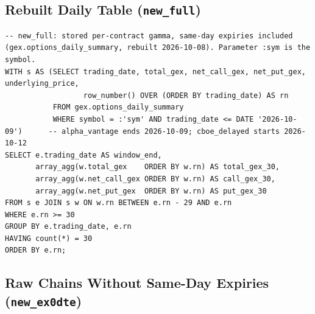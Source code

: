 \subsection{Rebuilt Daily Table (\texttt{new\_full})}
\label{app:series:full}

\begin{lstlisting}[style=appcode]
-- new_full: stored per-contract gamma, same-day expiries included (gex.options_daily_summary, rebuilt 2026-10-08). Parameter :sym is the symbol.
WITH s AS (SELECT trading_date, total_gex, net_call_gex, net_put_gex, underlying_price,
                  row_number() OVER (ORDER BY trading_date) AS rn
           FROM gex.options_daily_summary
           WHERE symbol = :'sym' AND trading_date <= DATE '2026-10-09')      -- alpha_vantage ends 2026-10-09; cboe_delayed starts 2026-10-12
SELECT e.trading_date AS window_end,
       array_agg(w.total_gex    ORDER BY w.rn) AS total_gex_30,
       array_agg(w.net_call_gex ORDER BY w.rn) AS call_gex_30,
       array_agg(w.net_put_gex  ORDER BY w.rn) AS put_gex_30
FROM s e JOIN s w ON w.rn BETWEEN e.rn - 29 AND e.rn
WHERE e.rn >= 30
GROUP BY e.trading_date, e.rn
HAVING count(*) = 30
ORDER BY e.rn;
\end{lstlisting}

\subsection{Raw Chains Without Same-Day Expiries (\texttt{new\_ex0dte})}
\label{app:series:ex0dte}

